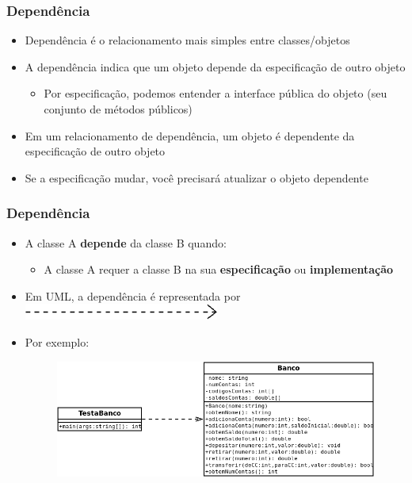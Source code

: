\documentclass[aspectratio=169]{beamer}
\begin{document}
\begin{frame}\frametitle{Dependência}
\begin{itemize}
	\item Dependência é o relacionamento mais simples entre classes/objetos
	\item A dependência indica que um objeto depende da especificação de outro objeto
	\begin{itemize}
		\item Por especificação, podemos entender a interface pública do objeto (seu conjunto de métodos públicos)
	\end{itemize}
	\item Em um relacionamento de dependência, um objeto é dependente da especificação de outro objeto
	\item Se a especificação mudar, você precisará atualizar o objeto dependente
\end{itemize}
\end{frame}

\begin{frame}\frametitle{Dependência}
\begin{itemize}
	\item A classe A \textbf{depende} da classe B quando:
	\begin{itemize}
		\item A classe A requer a classe B na sua \textbf{especificação} ou \textbf{implementação}
	\end{itemize}
	\item Em UML, a dependência é representada por \includegraphics[height=0.025\paperheight]{imagens/dependencia0.png}
	\item Por exemplo:
	\begin{figure}[h]
		\includegraphics[height=0.4\paperheight]{imagens/dependencia1.png}
	\end{figure}
\end{itemize}
\end{frame}
\end{document}
